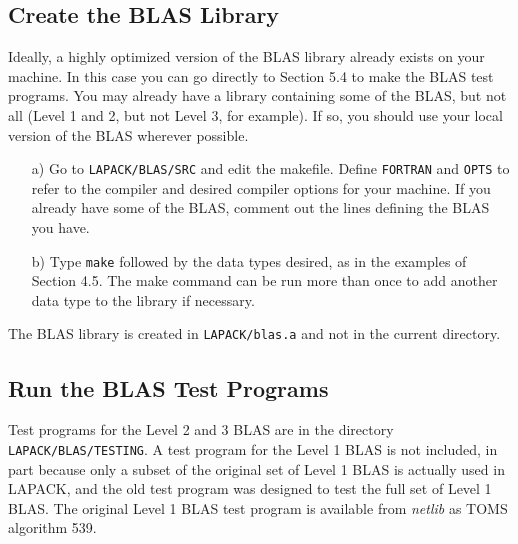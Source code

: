 \subsection{Create the BLAS Library} 
\dent
Ideally, a highly optimized version of the BLAS library already
exists on your machine. 
In this case you can go directly to Section 5.4 to
make the BLAS test programs.  
You may already have a library containing some of the BLAS,
but not all (Level 1 and 2, but not Level 3, for example).
If so, you should use your local version of the BLAS wherever
possible.

\begin{itemize}
\item[a)]
Go to {\tt LAPACK/BLAS/SRC} and edit the makefile. 
Define {\tt FORTRAN} and {\tt OPTS} to refer to the 
compiler and desired compiler options for your machine.
If you already have some of the BLAS, comment out the lines 
defining the BLAS you have.  

\item[b)]
Type {\tt make} followed by the data types desired, as in the examples
of Section 4.5.
The make command can be run more than once to add another
data type to the library if necessary.  
\end{itemize}

\noindent
The BLAS library is created in {\tt LAPACK/blas.a} and not in the
current directory.

\subsection{Run the BLAS Test Programs}

\dent
Test programs for the Level 2 and 3 BLAS are in the directory 
{\tt LAPACK/BLAS/TESTING}.  
A test program for the Level 1 BLAS is not
included, in part because only a subset of the original set
of Level 1 BLAS is actually used in LAPACK, and the old 
test program was designed to test the full set of Level 1 BLAS. 
The original Level 1 BLAS test program is available from {\em netlib}
as TOMS algorithm 539.

